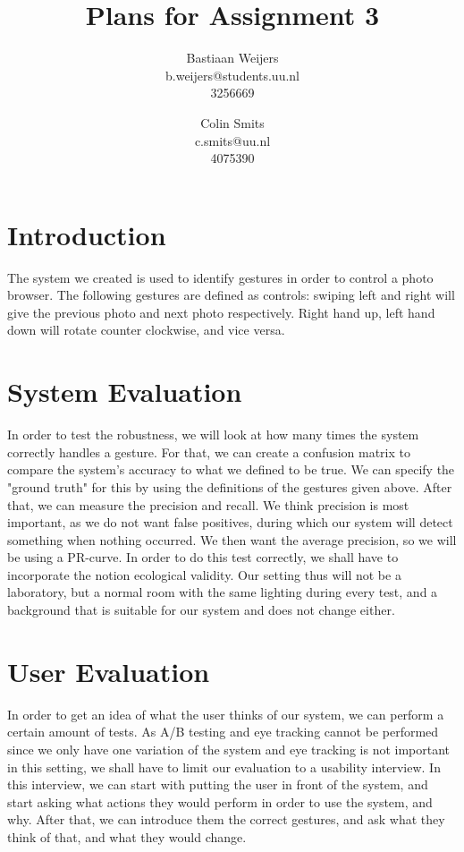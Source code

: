 \documentclass[11pt,a4paper]{article}
\author{Bastiaan Weijers \\ b.weijers@students.uu.nl \\ 3256669 \and Colin Smits \\ c.smits@uu.nl \\4075390}
\date{}
\title{\textbf{Plans for Assignment 3}}
\begin{document}
\maketitle
\section{Introduction}
The system we created is used to identify gestures in order to control a photo browser. The following gestures are defined as controls: swiping left and right will give the previous photo and next photo respectively. Right hand up, left hand down will rotate counter clockwise, and vice versa.

\section{System Evaluation}
In order to test the robustness, we will look at how many times the system correctly handles a gesture. For that, we can create a confusion matrix to compare the system's accuracy to what we defined to be true. We can specify the "ground truth" for this by using the definitions of the gestures given above. After that, we can measure the precision and recall. We think precision is most important, as we do not want false positives, during which our system will detect something when nothing occurred. We then want the average precision, so we will be using a PR-curve. In order to do this test correctly, we shall have to incorporate the notion ecological validity. Our setting thus will not be a laboratory, but a normal room with the same lighting during every test, and a background that is suitable for our system and does not change either.


\section{User Evaluation}
In order to get an idea of what the user thinks of our system, we can perform a certain amount of tests. As A/B testing and eye tracking cannot be performed since we only have one variation of the system and eye tracking is not important in this setting, we shall have to limit our evaluation to a usability interview. In this interview, we can start with putting the user in front of the system, and start asking what actions they would perform in order to use the system, and why. After that, we can introduce them the correct gestures, and ask what they think of that, and what they would change. 
\end{document}
